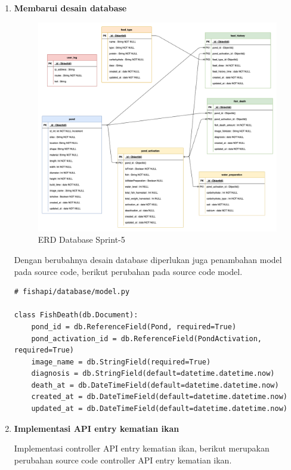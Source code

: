 \begin{enumerate}[1.]

\item \textbf{Membarui desain database}

\begin{figure}[H]
	\centering
	\includegraphics[height=0.7\textwidth]{gambar/Sprint05/diagram database/database}
	\caption{ERD Database Sprint-5}
	\label{fig:database_sprint5}
\end{figure}

Dengan berubahnya desain database diperlukan juga penambahan model pada source code, berikut perubahan pada source code model.

\begin{lstlisting}
# fishapi/database/model.py

class FishDeath(db.Document):
    pond_id = db.ReferenceField(Pond, required=True)
    pond_activation_id = db.ReferenceField(PondActivation, required=True)
    image_name = db.StringField(required=True)
    diagnosis = db.StringField(default=datetime.datetime.now)
    death_at = db.DateTimeField(default=datetime.datetime.now)
    created_at = db.DateTimeField(default=datetime.datetime.now)
    updated_at = db.DateTimeField(default=datetime.datetime.now)
\end{lstlisting}




\item \textbf{Implementasi API entry kematian ikan}

Implementasi controller API entry kematian ikan, berikut merupakan perubahan source code controller API entry kematian ikan.


\end{enumerate}
